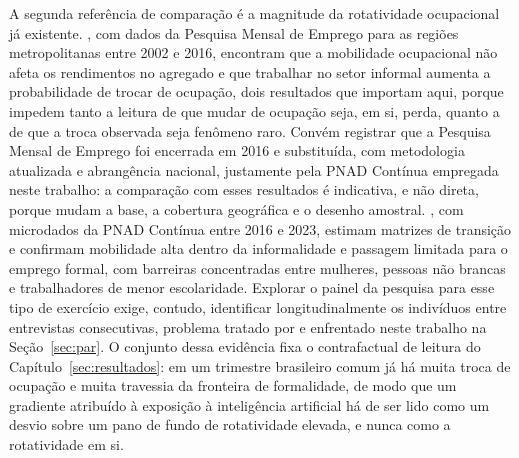 A segunda referência de comparação é a magnitude da rotatividade ocupacional já
existente. , com dados da Pesquisa Mensal de Emprego para
as regiões metropolitanas entre 2002 e 2016, encontram que a mobilidade
ocupacional não afeta os rendimentos no agregado e que trabalhar no setor
informal aumenta a probabilidade de trocar de ocupação, dois resultados que
importam aqui, porque impedem tanto a leitura de que mudar de ocupação seja, em
si, perda, quanto a de que a troca observada seja fenômeno raro. Convém
registrar que a Pesquisa Mensal de Emprego foi encerrada em 2016 e substituída,
com metodologia atualizada e abrangência nacional, justamente pela PNAD Contínua
empregada neste trabalho: a comparação com esses resultados é indicativa, e não
direta, porque mudam a base, a cobertura geográfica e o desenho amostral.
, com microdados da PNAD Contínua entre 2016 e 2023,
estimam matrizes de transição e confirmam mobilidade alta dentro da
informalidade e passagem limitada para o emprego formal, com barreiras
concentradas entre mulheres, pessoas não brancas e trabalhadores de menor
escolaridade. Explorar o painel da pesquisa para esse tipo de exercício exige,
contudo, identificar longitudinalmente os indivíduos entre entrevistas
consecutivas, problema tratado por  e enfrentado neste
trabalho na Seção~\ref{sec:par}. O conjunto dessa evidência fixa o contrafactual de leitura
do Capítulo~\ref{sec:resultados}: em um trimestre brasileiro comum já há muita
troca de ocupação e muita travessia da fronteira de formalidade, de modo que um
gradiente atribuído à exposição à inteligência artificial há de ser lido como um desvio sobre um pano de fundo de rotatividade elevada, e nunca como a
rotatividade em si.
